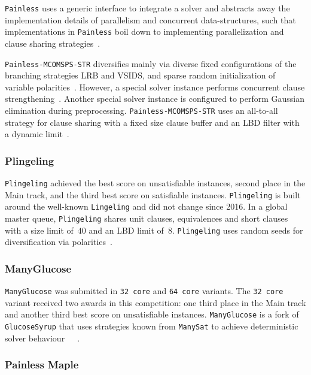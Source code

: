 \documentclass{elsarticle}
\newcommand{\solver}[1]{\texttt{#1}}
\begin{document}
\solver{Painless} uses a generic interface to integrate a solver and abstracts away the implementation details of parallelism and concurrent data-structures, such that implementations in \solver{Painless} boil down to implementing parallelization and clause sharing strategies~\cite{Frioux:2017:Painless}. 

\solver{Painless-MCOMSPS-STR} diversifies mainly via diverse fixed configurations of the branching strategies LRB and VSIDS, and sparse random initialization of variable polarities~\cite{Balyo:2015:HordeSATs}. 
However, a special solver instance performs concurrent clause strengthening~\cite{Wieringa:2013:CCS}. 
Another special solver instance is configured to perform Gaussian elimination during preprocessing. 
\solver{Painless-MCOMSPS-STR} uses an all-to-all strategy for clause sharing with a fixed size clause buffer and an LBD filter with a dynamic limit~\cite{SC2020}. 


\subsubsection{Plingeling} 

\solver{Plingeling} achieved the best score on unsatisfiable instances, second place in the Main track, and the third best score on satisfiable instances. 
\solver{Plingeling} is built around the well-known \solver{Lingeling} and did not change since 2016. 
In a global master queue, \solver{Plingeling} shares unit clauses, equivalences and short clauses with a size limit of~$40$ and an LBD limit of~$8$. 
\solver{Plingeling} uses random seeds for diversification via polarities~\cite{Biere:SC2020,Biere:2012:Lingeling}. 


\subsubsection{ManyGlucose}

\solver{ManyGlucose} was submitted in \solver{32 core} and \solver{64 core} variants. 
The \solver{32 core} variant received two awards in this competition: one third place in the Main track and another third best score on unsatisfiable instances. 
\solver{ManyGlucose} is a fork of \solver{GlucoseSyrup} that uses strategies known from \solver{ManySat} to achieve deterministic solver behaviour~\cite{Audemard:2018:GlucoseSyrup}~\cite{Audemard:2014:LazyClauseExchange}~\cite{Hamadi:2009:ManySat}. 


\subsubsection{Painless Maple} 
\end{document}
